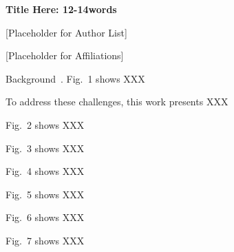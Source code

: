 \documentclass[12pt,letterpaper]{article} %
\begin{document}
\begin{comment}
times ×:	{\char"D7}
degree °:	{\char"B0}
tilda ~:	{\char"7E}

alpha ⍺:	{\char"3B1}
beta β:		{\char"3B2}
gamma γ:	{\char"3B3}
theta θ:	{\char"3B8}
omega ⍵:	{\char"3C9}

degree celsius ℃:  {\char"B0}C
degree fahrenheit: {\char"B0}F
Ohm Ω: {\char"3A9}

再找不到就去这里找！
https://unicodelookup.com
\end{comment}

\textbf{Title Here: 12-14words}

[Placeholder for Author List]

[Placeholder for Affiliations]

Background~\cite{by22}. Fig.~1 shows XXX

To address these challenges, this work presents XXX

Fig.~2 shows XXX

Fig.~3 shows XXX

Fig.~4 shows XXX

Fig.~5 shows XXX

Fig.~6 shows XXX

Fig.~7 shows XXX


\clearpage




\begin{comment}

# Authors:
Bonan Yan , Peking University, bonanyan@pku.edu.cn

# Abstract (≤500 characters, including space/symbols)
blabla

# 1-Sentence Highlighter
This work presents the first XXX, achieving 1000TOPS/W.


\end{comment}
\end{document}
